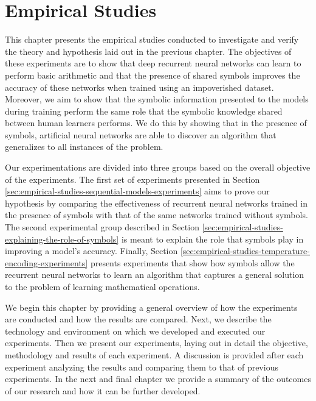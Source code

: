 \chapter{Empirical Studies} \label{sec:empirical-studies}

This chapter presents the empirical studies conducted to investigate and verify the theory and hypothesis laid out in the previous chapter. The objectives of these experiments are to show that deep recurrent neural networks can learn to perform basic arithmetic and that the presence of shared symbols improves the accuracy of these networks when trained using an impoverished dataset. Moreover, we aim to show that the symbolic information presented to the models during training perform the same role that the symbolic knowledge shared between human learners performs. We do this by showing that in the presence of symbols, artificial neural networks are able to discover an algorithm that generalizes to all instances of the problem.

Our experimentations are divided into three groups based on the overall objective of the experiments. The first set of experiments presented in Section \ref{sec:empirical-studies-sequential-models-experiments} aims to prove our hypothesis by comparing the effectiveness of recurrent neural networks trained in the presence of symbols with that of the same networks trained without symbols. The second experimental group described in Section \ref{sec:empirical-studies-explaining-the-role-of-symbols} is meant to explain the role that symbols play in improving a model's accuracy. Finally, Section \ref{sec:empirical-studies-temperature-encoding-experiments} presents  experiments that show how symbols allow the recurrent neural networks to learn an algorithm that captures a general solution to the problem of learning mathematical operations. 

We begin this chapter by providing a general overview of how the experiments are conducted and how the results are compared. Next, we describe the technology and environment on which we developed and executed our experiments. Then we present our experiments, laying out in detail the objective, methodology and results of each experiment. A discussion is provided after each experiment analyzing the results and comparing them to that of previous experiments. In the next and final chapter we provide a summary of the outcomes of our research and how it can be further developed.











